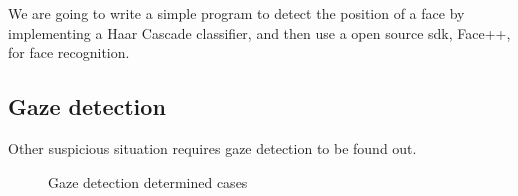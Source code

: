 \documentclass[11pt,letterpaper]{article}
\begin{document}
We are going to write a simple program to detect the position of a face by implementing a Haar Cascade classifier, and then use a open source sdk, Face++\cite{facepp}, for face recognition.

\subsection{Gaze detection}

Other suspicious situation requires gaze detection to be found out.

\begin{figure}[htb!]
  \centering
  \quad
	\caption{Gaze detection determined cases}
\end{figure}
\end{document}
